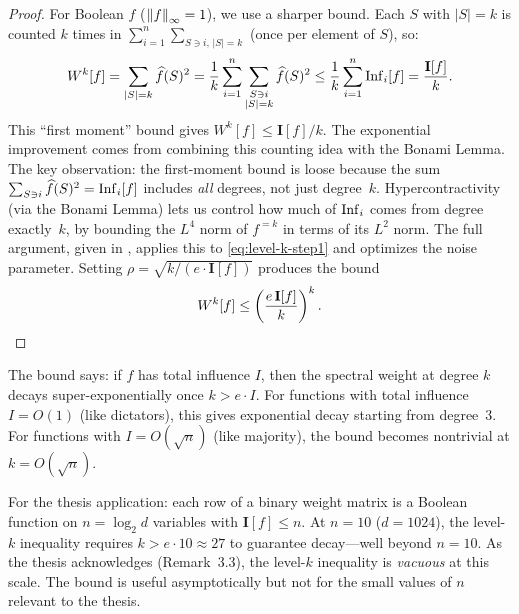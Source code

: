 \begin{proof}
For Boolean $f$ ($\left\| f \right\|_\infty = 1$), we use a sharper bound.
Each $S$ with $|S| = k$ is counted $k$ times in
$\sum_{i=1}^n \sum_{S \ni i,\, |S|=k}$ (once per element of $S$), so:
\[
  W^k[f] = \sum_{|S|=k} \widehat{f}(S)^2
  = \frac{1}{k} \sum_{i=1}^n \sum_{\substack{S \ni i \\ |S| = k}} \widehat{f}(S)^2
  \leq \frac{1}{k} \sum_{i=1}^n \operatorname{Inf}_i[f]
  = \frac{\mathbf{I}[f]}{k}.
\]
This ``first moment'' bound gives $W^k[f] \leq \mathbf{I}[f] / k$.
The exponential improvement comes from combining this counting idea
with the Bonami Lemma. The key observation: the first-moment bound
is loose because the sum $\sum_{S \ni i} \widehat{f}(S)^2 = \operatorname{Inf}_i[f]$
includes \emph{all} degrees, not just degree~$k$. Hypercontractivity
(via the Bonami Lemma) lets us control how much of $\operatorname{Inf}_i$ comes from
degree exactly~$k$, by bounding the $L^4$ norm of $f^{=k}$ in terms of
its $L^2$ norm. The full argument, given in
\citet[Theorem~9.24]{odonnell2014analysis}, applies this to
\eqref{eq:level-k-step1} and optimizes the noise
parameter. Setting $\rho = \sqrt{k / (e \cdot \mathbf{I}[f])}$
produces the bound
\[
  W^k[f] \leq \left(\frac{e\,\mathbf{I}[f]}{k}\right)^k.
  \qedhere
\]
\end{proof}

\begin{remark}\label{rem:level-k-meaning}
The bound says: if $f$ has total influence $I$, then the spectral weight
at degree $k$ decays super-exponentially once $k > e \cdot I$. For
functions with total influence $I = O(1)$ (like dictators), this gives
exponential decay starting from degree~$3$. For functions with
$I = O(\sqrt{n})$ (like majority), the bound becomes nontrivial at
$k = O(\sqrt{n})$.

For the thesis application: each row of a binary weight matrix is a
Boolean function on $n = \log_2 d$ variables with $\mathbf{I}[f] \leq n$.
At $n = 10$ ($d = 1024$), the level-$k$ inequality requires $k > e \cdot 10 \approx 27$
to guarantee decay---well beyond $n = 10$. As the thesis acknowledges
(Remark~3.3), the level-$k$ inequality is \emph{vacuous} at this scale.
The bound is useful asymptotically but not for the small values of $n$
relevant to the thesis.
\end{remark}


